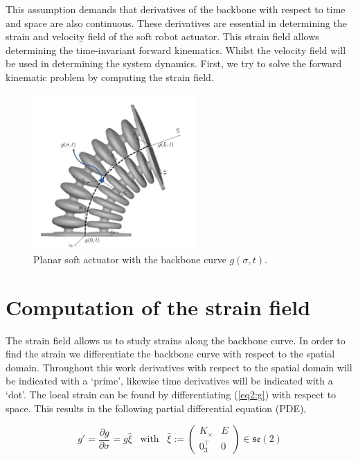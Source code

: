 This assumption demands that derivatives of the backbone with respect to time and space are also continuous. These derivatives are essential in determining the strain and velocity field of the soft robot actuator. This strain field allows determining the time-invariant forward kinematics. Whilst the velocity field will be used in determining the system dynamics. First, we try to solve the forward kinematic problem by computing the strain field.



\begin{figure}[H]
    \centering
    \includegraphics[width=0.55\textwidth]{Figures/Chapter2/actuatorschematic.png}
    \caption{Planar soft actuator with the backbone curve $g(\sigma,t)$.}
    \label{fig2:kinematicschematic}
\end{figure}


\section{Computation of the strain field}

The strain field allows us to study strains along the backbone curve. In order to find the strain we differentiate the backbone curve with respect to the spatial domain. Throughout this work derivatives with respect to the spatial domain will be indicated with a `prime', likewise time derivatives will be indicated with a `dot'. The local strain can be found by differentiating (\ref{eq2:g}) with respect to space. This results in the following partial differential equation (PDE), 

\begin{equation}
   g' = \frac{\partial g}{\partial \sigma} = g \hat{\xi} \hspace{10pt} \text{with} \hspace{10pt}  \hat{\xi} := \begin{pmatrix} K_\times & E \\ 0_3^\top & 0 \end{pmatrix} \in  \mathfrak{se}(2)
    \label{eq2:dgdsigma}
\end{equation}

